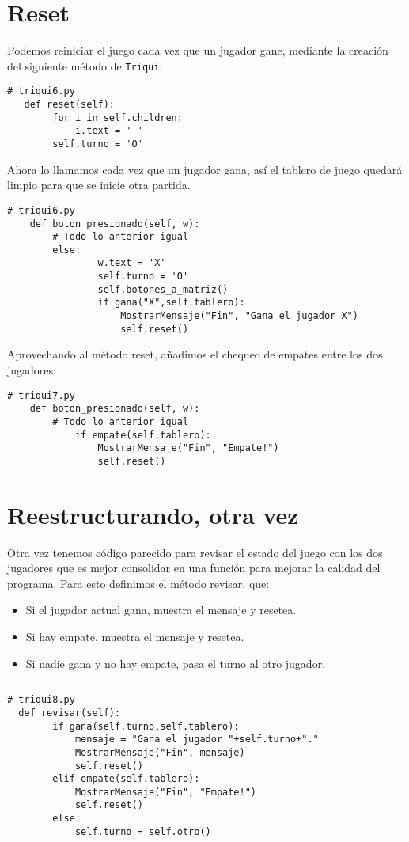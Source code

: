 \section{Reset}

Podemos reiniciar el juego cada vez que un jugador gane, mediante
la creación del siguiente método de \texttt{Triqui}:

\begin{verbatim}
# triqui6.py
   def reset(self):
        for i in self.children:
            i.text = ' '
        self.turno = 'O'
\end{verbatim}

Ahora lo llamamos cada vez que un jugador gana, así el tablero de
juego quedará limpio para que se inicie otra partida.

\begin{verbatim}
# triqui6.py
    def boton_presionado(self, w):
        # Todo lo anterior igual
        else:
                w.text = 'X'
                self.turno = 'O'
                self.botones_a_matriz()
                if gana("X",self.tablero):
                    MostrarMensaje("Fin", "Gana el jugador X")
                    self.reset()
\end{verbatim}

Aprovechando al método reset, añadimos el chequeo de empates entre
los dos jugadores:

\begin{verbatim}
# triqui7.py
    def boton_presionado(self, w):
        # Todo lo anterior igual
            if empate(self.tablero):
                MostrarMensaje("Fin", "Empate!")
                self.reset()
\end{verbatim}

\section{Reestructurando, otra vez}

Otra vez tenemos código parecido para revisar el estado del juego
con los dos jugadores que es mejor consolidar en una función para
mejorar la calidad del programa. Para esto definimos el método revisar,
que:
\begin{itemize}
\item Si el jugador actual gana, muestra el mensaje y resetea.
\item Si hay empate, muestra el mensaje y resetea.
\item Si nadie gana y no hay empate, pasa el turno al otro jugador. 
\end{itemize}
\begin{verbatim}

\end{verbatim}
\begin{verbatim}
# triqui8.py
  def revisar(self):          
        if gana(self.turno,self.tablero):
            mensaje = "Gana el jugador "+self.turno+"."
            MostrarMensaje("Fin", mensaje)
            self.reset()
        elif empate(self.tablero):
            MostrarMensaje("Fin", "Empate!")
            self.reset()
        else:
            self.turno = self.otro()
\end{verbatim}

